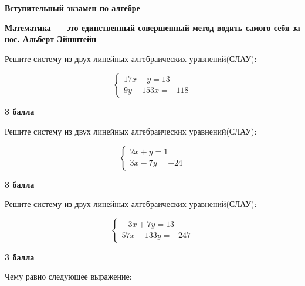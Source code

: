 \hspace{3mm}

\centerline{\bf \Huge Вступительный экзамен по алгебре}
\centerline{\bf \Huge }

\begin{flushright}
        \scriptsize{\textbf{Математика — это единственный совершенный метод водить самого себя за нос. Альберт Эйнштейн}}
\end{flushright}

 Решите систему из двух линейных алгебраических уравнений(СЛАУ):

\begin{equation*}
 \begin{cases}
   17x - y = 13
   \\
   9y - 153x = -118
 \end{cases}
\end{equation*}

\begin{flushright} \textbf{3 балла}\\ 
\end{flushright}

 Решите систему из двух линейных алгебраических уравнений(СЛАУ):

\begin{equation*}
 \begin{cases}
   2x + y = 1
   \\
   3x - 7y = -24
 \end{cases}
\end{equation*}

\begin{flushright} \textbf{3 балла}\\ 
\end{flushright}

 Решите систему из двух линейных алгебраических уравнений(СЛАУ):

\begin{equation*}
 \begin{cases}
   -3x + 7y = 13
   \\
   57x - 133y = -247
 \end{cases}
\end{equation*}

\begin{flushright} \textbf{3 балла}\\ 
\end{flushright}

 Чему равно следующее выражение: 

